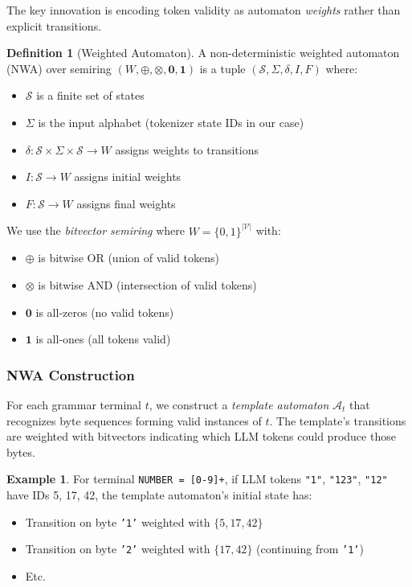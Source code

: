 \documentclass[11pt,a4paper]{article}
\newcommand{\vocab}{\mathcal{V}}
\newcommand{\states}{\mathcal{S}}
\newcommand{\automaton}{\mathcal{A}}
\theoremstyle{plain}
\theoremstyle{definition}
\newtheorem{definition}[theorem]{Definition}
\newtheorem{example}[theorem]{Example}
\theoremstyle{remark}
\begin{document}
The key innovation is encoding token validity as automaton \emph{weights} rather than explicit transitions.

\begin{definition}[Weighted Automaton]
A non-deterministic weighted automaton (NWA) over semiring $(W, \oplus, \otimes, \mathbf{0}, \mathbf{1})$ is a tuple $(\states, \Sigma, \delta, I, F)$ where:
\begin{itemize}
\item $\states$ is a finite set of states
\item $\Sigma$ is the input alphabet (tokenizer state IDs in our case)
\item $\delta: \states \times \Sigma \times \states \to W$ assigns weights to transitions
\item $I: \states \to W$ assigns initial weights
\item $F: \states \to W$ assigns final weights
\end{itemize}
\end{definition}

We use the \emph{bitvector semiring} where $W = \{0,1\}^{|\vocab|}$ with:
\begin{itemize}
\item $\oplus$ is bitwise OR (union of valid tokens)
\item $\otimes$ is bitwise AND (intersection of valid tokens)
\item $\mathbf{0}$ is all-zeros (no valid tokens)
\item $\mathbf{1}$ is all-ones (all tokens valid)
\end{itemize}

\subsubsection{NWA Construction}

For each grammar terminal $t$, we construct a \emph{template automaton} $\automaton_t$ that recognizes byte sequences forming valid instances of $t$. The template's transitions are weighted with bitvectors indicating which LLM tokens could produce those bytes.

\begin{example}
For terminal \texttt{NUMBER = [0-9]+}, if LLM tokens \texttt{"1"}, \texttt{"123"}, \texttt{"12"} have IDs 5, 17, 42, the template automaton's initial state has:
\begin{itemize}
\item Transition on byte \texttt{'1'} weighted with $\{5, 17, 42\}$
\item Transition on byte \texttt{'2'} weighted with $\{17, 42\}$ (continuing from \texttt{'1'})
\item Etc.
\end{itemize}
\end{example}
\end{document}
